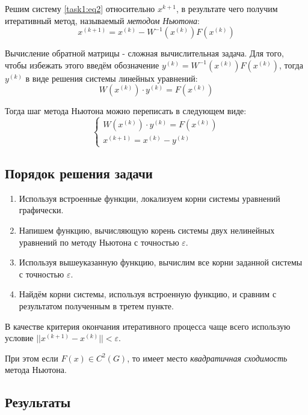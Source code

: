 \documentclass[12pt]{article}%
\begin{document}
Решим систему \ref{task1:eq2} относительно $x^{k+1}$, в результате чего получим итеративный метод, называемый \textit{методом Ньютона}:
\begin{equation}
    x^{(k+1)} = x^{(k)} - W^{-1}(x^{(k)}) F(x^{(k)})
\end{equation}

Вычисление обратной матрицы - сложная вычислительная задача. Для того, чтобы избежать этого введём обозначение $y^{(k)} = W^{-1}(x^{(k)})F(x^{(k)})$, тогда $y^{(k)}$ в виде решения системы линейных уравнений:
\begin{equation*}
    W(x^{(k)}) \cdot y^{(k)} = F(x^{(k)}) 
\end{equation*}

Тогда шаг метода Ньютона можно переписать в следующем виде:
\begin{equation}
    \begin{cases}
        W(x^{(k)}) \cdot y^{(k)} = F(x^{(k)}) \\
        x^{(k+1)} = x^{(k)} - y^{(k)}
    \end{cases}
\end{equation}

\subsection{Порядок решения задачи}
\begin{enumerate}
    \item Используя встроенные функции, локализуем корни системы уравнений графически.
    \item Напишем функцию, вычисляющую корень системы двух нелинейных уравнений по методу Ньютона с точностью $\varepsilon$.
    \item Используя вышеуказанную функцию, вычислим все корни заданной системы с точностью $\varepsilon$. 
    \item Найдём корни системы, используя встроенную функцию, и сравним с результатом полученным в третем пункте.
\end{enumerate}

В качестве критерия окончания итеративного процесса чаще всего использую условие $||x^{(k+1)} - x^{(k)}|| < \varepsilon$.

При этом если $F(x) \in C^2(G)$, то имеет место \textit{квадратичная сходимость} метода Ньютона.

\subsection{Результаты}
\end{document}
